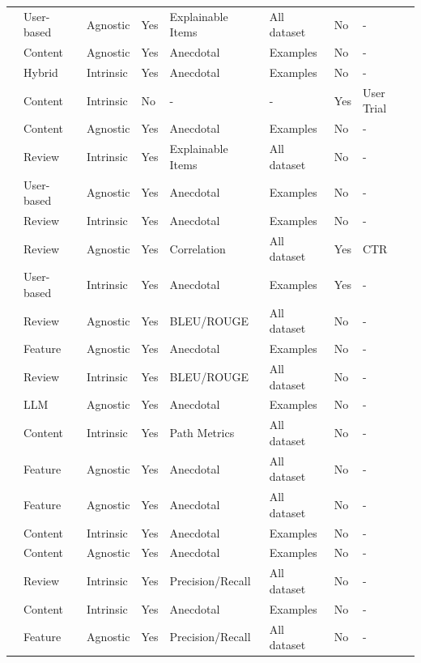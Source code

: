 \begin{tabular}{llllllll}
\cite{9260076} & User-based & Agnostic & Yes & Explainable Items & All dataset & No & - \\
\cite{10776491} & Content & Agnostic & Yes & Anecdotal & Examples & No & - \\
\cite{9005590} & Hybrid & Intrinsic & Yes & Anecdotal & Examples & No & - \\
\cite{10260804} & Content & Intrinsic & No & - & - & Yes & User Trial \\
\cite{10683822} & Content & Agnostic & Yes & Anecdotal & Examples & No & - \\
\cite{9079084} & Review & Intrinsic & Yes & Explainable Items & All dataset & No & - \\
\cite{9836983} & User-based & Agnostic & Yes & Anecdotal & Examples & No & - \\
\cite{10873804} & Review & Intrinsic & Yes & Anecdotal & Examples & No & - \\
\cite{8594883} & Review & Agnostic & Yes & Correlation & All dataset & Yes & CTR \\
\cite{10048787} & User-based & Intrinsic & Yes & Anecdotal & Examples & Yes & - \\
\cite{10446052} & Review & Agnostic & Yes & BLEU/ROUGE & All dataset & No & - \\
\cite{10827288} & Feature & Agnostic & Yes & Anecdotal & Examples & No & - \\
\cite{9482221} & Review & Intrinsic & Yes & BLEU/ROUGE & All dataset & No & - \\
\cite{10658914} & LLM & Agnostic & Yes & Anecdotal & Examples & No & - \\
\cite{10334552} & Content & Intrinsic & Yes & Path Metrics & All dataset & No & - \\
\cite{10825771} & Feature & Agnostic & Yes & Anecdotal & All dataset & No & - \\
\cite{10308154} & Feature & Agnostic & Yes & Anecdotal & All dataset & No & - \\
\cite{10742303} & Content & Intrinsic & Yes & Anecdotal & Examples & No & - \\
\cite{10623784} & Content & Agnostic & Yes & Anecdotal & Examples & No & - \\
\cite{10884422} & Review & Intrinsic & Yes & Precision/Recall & All dataset & No & - \\
\cite{SHIMIZU2022107970} & Content & Intrinsic & Yes & Anecdotal & Examples & No & - \\
\cite{BRUNOT2022102021} & Feature & Agnostic & Yes & Precision/Recall & All dataset & No & - \\

\end{tabular}
